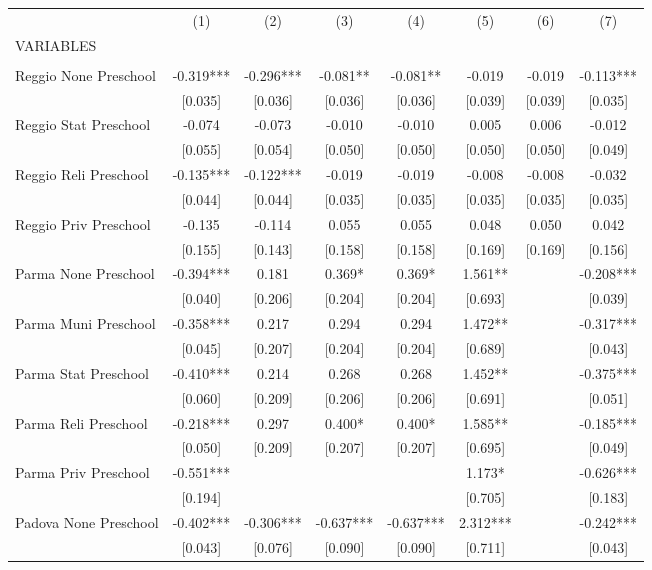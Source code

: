 \begin{tabular}{lccccccc} \hline
 & (1) & (2) & (3) & (4) & (5) & (6) & (7) \\
VARIABLES &  &  &  &  &  &  &  \\ \hline
 &  &  &  &  &  &  &  \\
Reggio None Preschool & -0.319*** & -0.296*** & -0.081** & -0.081** & -0.019 & -0.019 & -0.113*** \\
 & [0.035] & [0.036] & [0.036] & [0.036] & [0.039] & [0.039] & [0.035] \\
Reggio Stat Preschool & -0.074 & -0.073 & -0.010 & -0.010 & 0.005 & 0.006 & -0.012 \\
 & [0.055] & [0.054] & [0.050] & [0.050] & [0.050] & [0.050] & [0.049] \\
Reggio Reli Preschool & -0.135*** & -0.122*** & -0.019 & -0.019 & -0.008 & -0.008 & -0.032 \\
 & [0.044] & [0.044] & [0.035] & [0.035] & [0.035] & [0.035] & [0.035] \\
Reggio Priv Preschool & -0.135 & -0.114 & 0.055 & 0.055 & 0.048 & 0.050 & 0.042 \\
 & [0.155] & [0.143] & [0.158] & [0.158] & [0.169] & [0.169] & [0.156] \\
Parma None Preschool & -0.394*** & 0.181 & 0.369* & 0.369* & 1.561** &  & -0.208*** \\
 & [0.040] & [0.206] & [0.204] & [0.204] & [0.693] &  & [0.039] \\
Parma Muni Preschool & -0.358*** & 0.217 & 0.294 & 0.294 & 1.472** &  & -0.317*** \\
 & [0.045] & [0.207] & [0.204] & [0.204] & [0.689] &  & [0.043] \\
Parma Stat Preschool & -0.410*** & 0.214 & 0.268 & 0.268 & 1.452** &  & -0.375*** \\
 & [0.060] & [0.209] & [0.206] & [0.206] & [0.691] &  & [0.051] \\
Parma Reli Preschool & -0.218*** & 0.297 & 0.400* & 0.400* & 1.585** &  & -0.185*** \\
 & [0.050] & [0.209] & [0.207] & [0.207] & [0.695] &  & [0.049] \\
Parma Priv Preschool & -0.551*** &  &  &  & 1.173* &  & -0.626*** \\
 & [0.194] &  &  &  & [0.705] &  & [0.183] \\
Padova None Preschool & -0.402*** & -0.306*** & -0.637*** & -0.637*** & 2.312*** &  & -0.242*** \\
 & [0.043] & [0.076] & [0.090] & [0.090] & [0.711] &  & [0.043] \\

\end{tabular}
